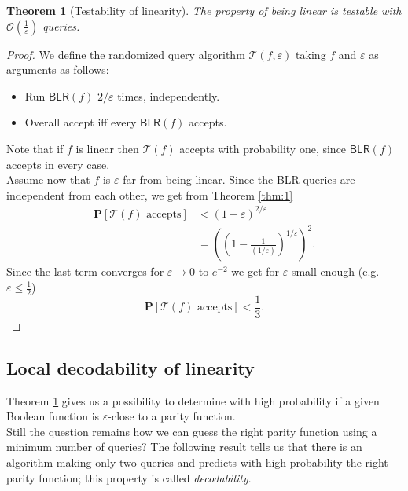 \documentclass[a4paper]{article}
\newcommand{\prob}{\mathbf{P}}
\newcommand{\eps}{\varepsilon}
\theoremstyle{plain}
\newtheorem{theorem}{Theorem}
\theoremstyle{definition}
\theoremstyle{remark}
\begin{document}
\begin{theorem}[Testability of linearity] \label{thm:2}
  The property of being linear is testable with
  \(\mathcal{O}\left(\frac{1}{\eps}\right)\) queries. 
\end{theorem}

\begin{proof}
  We define the randomized query algorithm \(\mathcal{T}(f,\eps)\)
  taking \(f\) and \(\eps\) as arguments as follows: 
  \begin{itemize}
  \item Run \(\textsf{BLR}(f)\) \(2/\eps\) times,
    independently.
  \item Overall accept iff every \(\textsf{BLR}(f)\) accepts. 
  \end{itemize}
  Note that if \(f\) is linear then \(\mathcal{T}(f)\) accepts with
  probability one, since \(\textsf{BLR}(f)\) accepts in every case.\\
  Assume now that \(f\) is \(\eps\)-far from being linear. Since the
  \textsf{BLR} queries are independent from each other, we get from
  Theorem \ref{thm:1}
  \begin{align}
    \prob\left[\mathcal{T}(f) \text{ accepts}\right] 
    &< \left(1-\eps\right)^{2/\eps} \\
    &= \left(\left(1-\frac{1}{(1/\eps)}\right)^{1/\eps}\right)^2.
  \end{align}
  Since the last term converges for \(\eps \rightarrow 0\) to
  \(e^{-2}\) we get for \(\eps\) small enough (e.g. \(\eps \leq
  \frac{1}{2}\)) 
  \[\prob\left[\mathcal{T}(f) \text{ accepts}\right] < \frac{1}{3}.\]
\end{proof}


\subsection{Local decodability of linearity}
\label{sec:local-decod-line}

Theorem \ref{thm:2} gives us a possibility to determine with high
probability if a given Boolean function is \(\eps\)-close to a parity
function. \\
Still the question remains how we can guess the right parity function
using a minimum number of queries? The following result tells us that
there is an algorithm making only two queries and predicts with high
probability the right parity function; this property is called
\emph{decodability}. 
\end{document}
